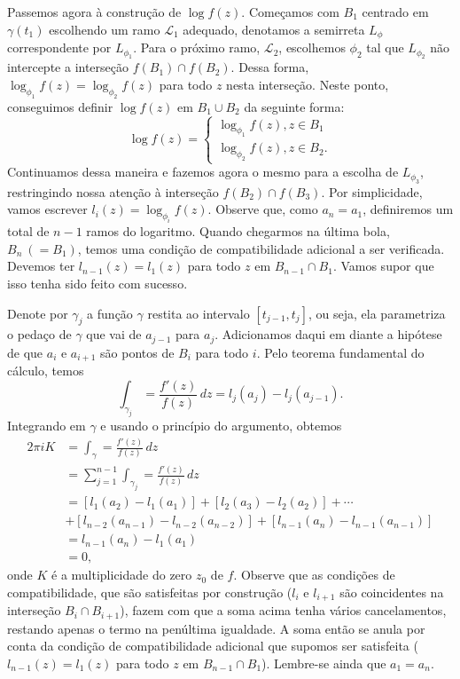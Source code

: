 Passemos agora à construção de $\log f(z)$. Começamos com $B_1$ centrado em $\gamma(t_1)$
escolhendo um ramo $\mathcal{L}_1$ adequado, denotamos a semirreta $L_\phi$ correspondente por
$L_{\phi_1}$. Para o próximo ramo, $\mathcal{L}_2$, escolhemos $\phi_2$ tal que $L_{\phi_2}$
não intercepte a interseção $f(B_1) \cap f(B_2)$. Dessa forma, 
$\log_{\phi_1} f(z) = \log_{\phi_2} f(z)$ para todo $z$ nesta interseção. 
Neste ponto, conseguimos definir $\log f(z)$ em $B_1 \cup B_2$ da seguinte forma:
%
\begin{equation*}
    \log f(z) =
    \begin{cases}
        \log_{\phi_1} f(z), z \in B_1 \\
        \log_{\phi_2} f(z), z \in B_2.
    \end{cases}
\end{equation*}
%
Continuamos dessa maneira e fazemos agora o mesmo para a escolha de $L_{\phi_3}$, 
restringindo nossa atenção à interseção $f(B_2) \cap f(B_3)$. Por simplicidade, 
vamos escrever $l_i(z) =  \log_{\phi_i} f(z)$. Observe que, como $a_n = a_1$, 
definiremos um total de $n-1$ ramos do logaritmo. Quando chegarmos na última bola, 
$B_n \ (= B_1)$, temos uma condição de compatibilidade adicional a ser verificada. 
Devemos ter $l_{n-1}(z) = l_1(z)$ para todo $z$ em $B_{n-1} \cap B_1$. Vamos supor que isso
tenha sido feito com sucesso.

Denote por $\gamma_j$ a função $\gamma$ restita ao intervalo $[t_{j-1},t_j]$, ou seja, ela
parametriza o pedaço de $\gamma$ que vai de $a_{j-1}$ para $a_j$. Adicionamos daqui em diante 
a hipótese de que $a_i$ e $a_{i+1}$ são pontos de $B_i$ para todo $i$. Pelo teorema fundamental
do cálculo, temos
%
\begin{equation*}
    \int_{\gamma_j} = \frac{f'(z)}{f(z)}\, dz = l_j(a_j) - l_j(a_{j-1}).  
\end{equation*}
%
Integrando em $\gamma$ e usando o princípio do argumento, obtemos
\begin{align*}
    2 \pi i K &= \int_{\gamma} = \frac{f'(z)}{f(z)}\, dz \\
    &= \sum_{j=1}^{n-1}\int_{\gamma_j} = \frac{f'(z)}{f(z)}\, dz \\
    &= [l_1(a_2) - l_1(a_1)] + [l_2(a_3) - l_2(a_2)] + \cdots \\
    &+ [l_{n-2}(a_{n-1}) - l_{n-2}(a_{n-2})] + [l_{n-1}(a_{n}) - l_{n-1}(a_{n-1})] \\
    &= l_{n-1}(a_n) - l_1(a_1)\\
    &= 0,
\end{align*}
onde $K$ é a multiplicidade do zero $z_0$ de $f$. Observe que as condições de compatibilidade,
que são satisfeitas por construção ($l_i$ e $l_{i+1}$ são coincidentes na interseção 
$B_i \cap B_{i+1}$), fazem com que a soma acima tenha vários cancelamentos, restando apenas o
termo na penúltima igualdade. A soma então se anula por conta da condição de compatibilidade
adicional que supomos ser satisfeita ($l_{n-1}(z) = l_1(z)$ para todo $z$ em 
$B_{n-1} \cap B_1$). Lembre-se ainda que $a_1 = a_n$.

